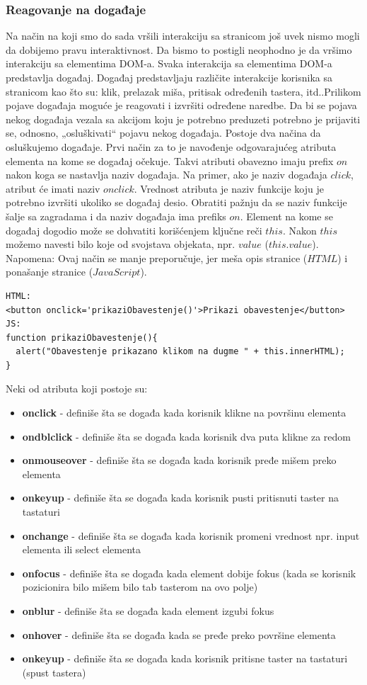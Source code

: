 \subsubsection{Reagovanje na događaje}
Na način na koji smo do sada vršili interakciju sa stranicom još uvek nismo mogli da dobijemo pravu interaktivnost. Da bismo to postigli neophodno je da vršimo interakciju sa elementima DOM-a.
Svaka interakcija sa elementima DOM-a predstavlja događaj. Događaj predstavljaju različite interakcije korisnika sa stranicom kao što su: klik, prelazak miša, pritisak određenih tastera, itd..Prilikom pojave događaja moguće je reagovati i izvršiti određene naredbe. Da bi se pojava nekog događaja vezala sa akcijom koju je potrebno preduzeti potrebno je prijaviti se, odnosno, „osluškivati“ pojavu nekog događaja.  Postoje dva načina da osluškujemo događaje. Prvi način za to je navođenje odgovarajućeg atributa elementa na kome se događaj očekuje. Takvi atributi obavezno imaju prefix $on$ nakon koga se nastavlja naziv događaja. Na primer, ako je naziv događaja $click$, atribut će imati naziv $onclick$. Vrednost atributa je naziv funkcije koju je potrebno izvršiti ukoliko se događaj desio. Obratiti pažnju da se naziv funkcije šalje sa zagradama i da naziv događaja ima prefiks $on$. Element na kome se događaj dogodio može se dohvatiti korišćenjem ključne reči $this$. Nakon $this$ možemo navesti bilo koje od svojstava objekata, npr. $value$ ($this.value$). Napomena: Ovaj način se manje preporučuje, jer meša opis stranice ($HTML$) i ponašanje stranice ($JavaScript$). 
\begin{lstlisting}[backgroundcolor = \color{lightgray}, breaklines=true]
HTML:
<button onclick='prikaziObavestenje()'>Prikazi obavestenje</button>
JS:
function prikaziObavestenje(){
  alert("Obavestenje prikazano klikom na dugme " + this.innerHTML);
}
\end{lstlisting}
Neki od atributa koji postoje su: 
\begin{itemize}
\item \textbf{onclick} - definiše šta se događa kada korisnik klikne na površinu elementa 
\item \textbf{ondblclick} - definiše šta se događa kada korisnik dva puta klikne za redom
\item \textbf{onmouseover} - definiše šta se događa kada korisnik pređe mišem preko elementa
\item \textbf{onkeyup} - definiše šta se događa kada korisnik pusti pritisnuti taster na tastaturi 
\item \textbf{onchange} -  definiše šta se događa kada korisnik promeni vrednost npr. input elementa ili select elementa
\item \textbf{onfocus} - definiše šta se događa kada element dobije fokus (kada se korisnik pozicionira bilo mišem bilo tab tasterom na ovo polje)
\item \textbf{onblur} - definiše šta se događa kada element izgubi fokus
\item \textbf{onhover} - definiše šta se događa kada se pređe preko površine elementa 
\item \textbf{onkeyup} - definiše šta se događa kada korisnik pritisne taster na tastaturi (spust tastera)  
\end{itemize}                        
